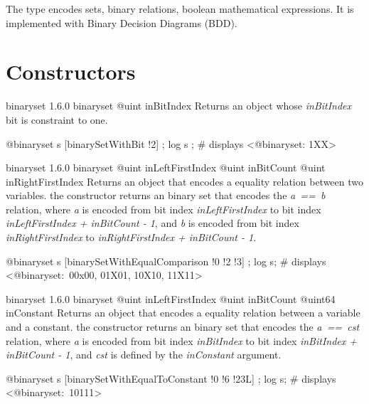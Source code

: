 

The  type encodes sets, binary relations, boolean mathematical expressions. It is implemented with Binary Decision Diagrams (BDD).


\section{Constructors}

{binaryset}
{1.6.0}
{binaryset}
{@uint inBitIndex}
{Returns an  object whose \emph{inBitIndex} bit is constraint to one.}
{}

\exempleDeuxLignes
{}
{@binaryset s [binarySetWithBit !2] ;}
{log s ; \# displays <@binaryset: 1XX>}





{binaryset}
{1.6.0}
{binaryset}
{@uint inLeftFirstIndex}
{@uint inBitCount}
{@uint inRightFirstIndex}
{Returns an  object that encodes a equality relation between two variables.}
{the constructor returns an binary set that encodes the \emph{a~==~b} relation, where \emph{a} is encoded from bit index \emph{inLeftFirstIndex} to bit index \emph{inLeftFirstIndex  + inBitCount - 1}, and \emph{b} is encoded from bit index \emph{inRightFirstIndex} to \emph{inRightFirstIndex + inBitCount - 1}.}

\exempleDeuxLignes
{}
{@binaryset s [binarySetWithEqualComparison !0 !2 !3] ;}
{log s; \# displays <@binaryset:~00x00, 01X01, 10X10, 11X11>}





{binaryset}
{1.6.0}
{binaryset}
{@uint inLeftFirstIndex}
{@uint inBitCount}
{@uint64 inConstant}
{Returns an  object that encodes a equality relation between a variable and a constant.}
{the constructor returns an binary set that encodes the \emph{a~==~cst} relation, where \emph {a} is encoded from bit index \emph{inBitIndex} to bit index \emph{inBitIndex  + inBitCount - 1}, and \emph{cst} is defined by the \emph{inConstant} argument.}

\exempleDeuxLignes
{}
{@binaryset s [binarySetWithEqualToConstant !0 !6 !23L] ;}
{log s; \# displays <@binaryset:~10111>}





